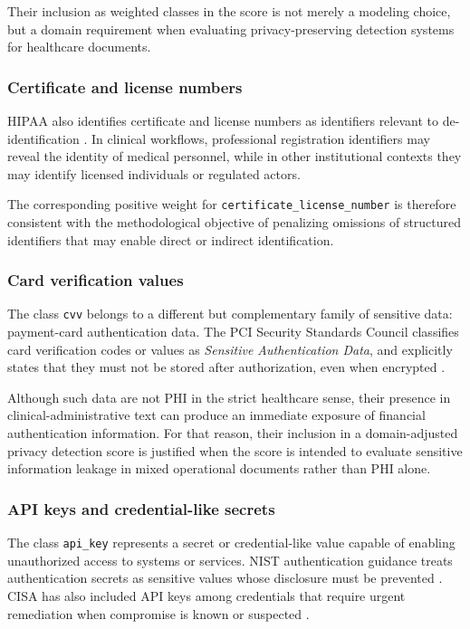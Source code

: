 \documentclass[11pt,a4paper]{article}
\begin{document}
Their inclusion as weighted classes in the score is not merely a modeling choice, but a domain requirement when evaluating privacy-preserving detection systems for healthcare documents.

\subsubsection{Certificate and license numbers}

HIPAA also identifies certificate and license numbers as identifiers relevant to de-identification \citep{hhs_hipaa_deidentification}. In clinical workflows, professional registration identifiers may reveal the identity of medical personnel, while in other institutional contexts they may identify licensed individuals or regulated actors.

The corresponding positive weight for \texttt{certificate\_license\_number} is therefore consistent with the methodological objective of penalizing omissions of structured identifiers that may enable direct or indirect identification.

\subsubsection{Card verification values}

The class \texttt{cvv} belongs to a different but complementary family of sensitive data: payment-card authentication data. The PCI Security Standards Council classifies card verification codes or values as \textit{Sensitive Authentication Data}, and explicitly states that they must not be stored after authorization, even when encrypted \citep{pci_cvv_2026}.

Although such data are not PHI in the strict healthcare sense, their presence in clinical-administrative text can produce an immediate exposure of financial authentication information. For that reason, their inclusion in a domain-adjusted privacy detection score is justified when the score is intended to evaluate sensitive information leakage in mixed operational documents rather than PHI alone.

\subsubsection{API keys and credential-like secrets}

The class \texttt{api\_key} represents a secret or credential-like value capable of enabling unauthorized access to systems or services. NIST authentication guidance treats authentication secrets as sensitive values whose disclosure must be prevented \citep{nist_sp800_63b_2025}. CISA has also included API keys among credentials that require urgent remediation when compromise is known or suspected \citep{cisa_ed2402_2026}.
\end{document}

